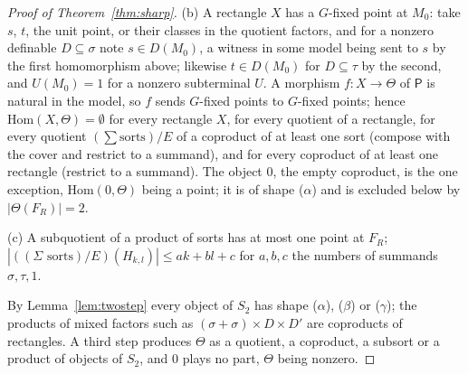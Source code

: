 \documentclass[11pt]{amsart}
\theoremstyle{definition}
\newcommand{\PP}{\mathsf P}
\begin{document}
\begin{proof}[Proof of Theorem~\ref{thm:sharp}]
(b) A rectangle $X$ has a $G$-fixed point at $M_0$: take
$s$, $t$, the unit point, or their classes in the quotient factors, and
for a nonzero definable $D\subseteq\sigma$ note $s\in D(M_0)$, a
witness in some model being sent to $s$ by the first homomorphism above;
likewise $t\in D(M_0)$ for $D\subseteq\tau$ by the second, and $U(M_0)=1$
for a nonzero subterminal $U$. A morphism $f\colon X\to\Theta$ of $\PP$
is natural in the model, so $f$ sends $G$-fixed points to $G$-fixed
points; hence $\mathrm{Hom}(X,\Theta)=\emptyset$ for every rectangle $X$,
for every quotient of a rectangle, for every quotient
$(\sum\text{sorts})/E$ of a coproduct of at least one sort (compose
with the cover and restrict to a summand), and for every coproduct of
at least one rectangle (restrict to a summand). The object $0$, the
empty coproduct, is the one exception, $\mathrm{Hom}(0,\Theta)$ being a
point; it is of shape ($\alpha$) and is excluded below by
$|\Theta(F_R)|=2$.

(c) A subquotient of a product of sorts has at most one point at $F_R$;
$|((\Sigma\text{ sorts})/E)(H_{k,l})|\le ak+bl+c$ for $a,b,c$ the numbers
of summands $\sigma,\tau,1$.

By Lemma~\ref{lem:twostep} every object of $S_2$ has shape ($\alpha$),
($\beta$) or ($\gamma$); the products of mixed factors such as
$(\sigma+\sigma)\times D\times D'$ are coproducts of rectangles. A third
step produces $\Theta$ as a quotient, a coproduct, a subsort or a
product of objects of $S_2$, and $0$ plays no part, $\Theta$ being
nonzero.


\end{proof}
\end{document}
